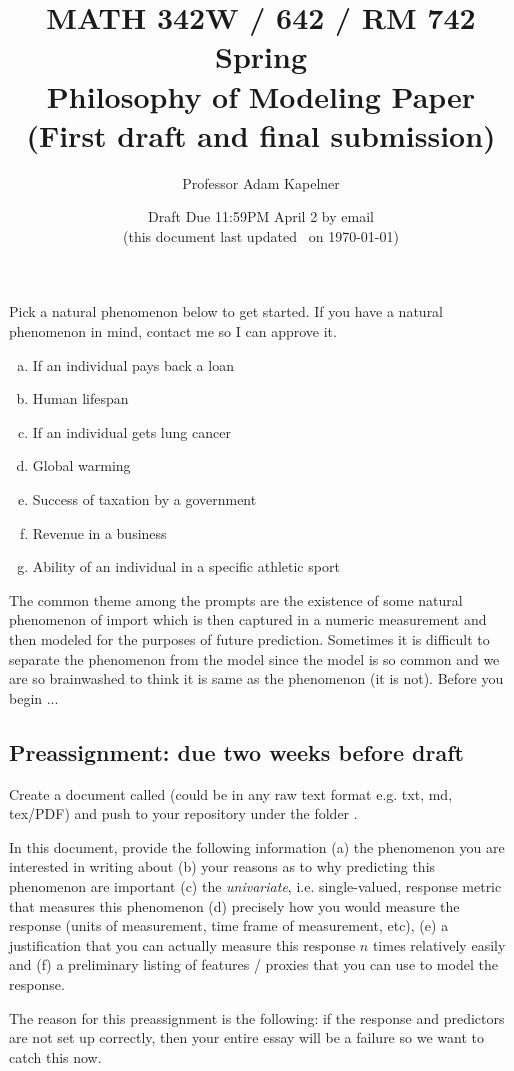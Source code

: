 \documentclass[12pt]{article}
\title{MATH 342W / 642 / RM 742 Spring \the\year \\ Philosophy of Modeling Paper \\ (First draft and final submission)}
\author{Professor Adam Kapelner} %
\date{Draft Due 11:59PM April 2 by email \\ \vspace{0.5cm} \small (this document last updated \currenttime~on \today)}
\begin{document}
\maketitle

\noindent Pick a natural phenomenon below to get started. If you have a natural phenomenon in mind, contact me so I can approve it.

\begin{enumerate}[(a)]
\item If an individual pays back a loan
\item Human lifespan
\item If an individual gets lung cancer
\item Global warming
\item Success of taxation by a government
\item Revenue in a business
\item Ability of an individual in a specific athletic sport 
\end{enumerate}

The common theme among the prompts are the existence of some natural phenomenon of import which is then captured in a numeric measurement and then modeled for the purposes of future prediction. Sometimes it is difficult to separate the phenomenon from the model since the model is so common and we are so brainwashed to think it is same as the phenomenon (it is not). Before you begin ...

\subsection*{Preassignment: due two weeks before draft}

Create a document called  (could be in any raw text format e.g. txt, md, tex/PDF) and push to your repository under the folder . 

In this document, provide the following information (a) the phenomenon you are interested in writing about (b) your reasons as to why predicting this phenomenon are important (c) the \emph{univariate}, i.e. single-valued, response metric that measures this phenomenon (d) precisely how you would measure the response (units of measurement, time frame of measurement, etc), (e) a justification that you can actually measure this response $n$ times relatively easily and (f) a preliminary listing of features / proxies that you can use to model the response. 

The reason for this preassignment is the following: if the response and predictors are not set up correctly, then your entire essay will be a failure so we want to catch this now.
\end{document}
